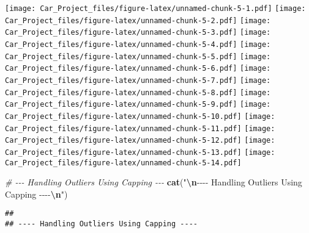 \documentclass[
]{article}
\newenvironment{Shaded}{\begin{snugshade}}{\end{snugshade}}
\newcommand{\CommentTok}[1]{\textcolor[rgb]{0.56,0.35,0.01}{\textit{#1}}}
\newcommand{\FunctionTok}[1]{\textcolor[rgb]{0.13,0.29,0.53}{\textbf{#1}}}
\newcommand{\NormalTok}[1]{#1}
\newcommand{\SpecialCharTok}[1]{\textcolor[rgb]{0.81,0.36,0.00}{\textbf{#1}}}
\newcommand{\StringTok}[1]{\textcolor[rgb]{0.31,0.60,0.02}{#1}}
\begin{document}
\texttt{[image: Car\_Project\_files/figure-latex/unnamed-chunk-5-1.pdf]}
\texttt{[image: Car\_Project\_files/figure-latex/unnamed-chunk-5-2.pdf]}
\texttt{[image: Car\_Project\_files/figure-latex/unnamed-chunk-5-3.pdf]}
\texttt{[image: Car\_Project\_files/figure-latex/unnamed-chunk-5-4.pdf]}
\texttt{[image: Car\_Project\_files/figure-latex/unnamed-chunk-5-5.pdf]}
\texttt{[image: Car\_Project\_files/figure-latex/unnamed-chunk-5-6.pdf]}
\texttt{[image: Car\_Project\_files/figure-latex/unnamed-chunk-5-7.pdf]}
\texttt{[image: Car\_Project\_files/figure-latex/unnamed-chunk-5-8.pdf]}
\texttt{[image: Car\_Project\_files/figure-latex/unnamed-chunk-5-9.pdf]}
\texttt{[image: Car\_Project\_files/figure-latex/unnamed-chunk-5-10.pdf]}
\texttt{[image: Car\_Project\_files/figure-latex/unnamed-chunk-5-11.pdf]}
\texttt{[image: Car\_Project\_files/figure-latex/unnamed-chunk-5-12.pdf]}
\texttt{[image: Car\_Project\_files/figure-latex/unnamed-chunk-5-13.pdf]}
\texttt{[image: Car\_Project\_files/figure-latex/unnamed-chunk-5-14.pdf]}

\begin{Shaded}
\begin{Highlighting}[]
\CommentTok{\# {-}{-}{-} Handling Outliers Using Capping {-}{-}{-}}
\FunctionTok{cat}\NormalTok{(}\StringTok{"}\SpecialCharTok{\textbackslash{}n}\StringTok{{-}{-}{-}{-} Handling Outliers Using Capping {-}{-}{-}{-}}\SpecialCharTok{\textbackslash{}n}\StringTok{"}\NormalTok{)}
\end{Highlighting}
\end{Shaded}

\begin{verbatim}
## 
## ---- Handling Outliers Using Capping ----
\end{verbatim}
\end{document}
